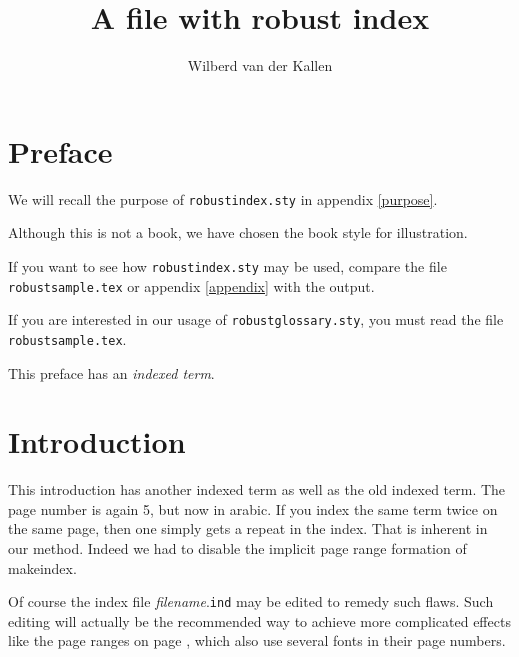 \documentclass{book}
\title {A file with robust index}
\author{Wilberd van der Kallen\index{Wilberd}}
\date{}
\begin{document}
\renewcommand\thepage{\roman{page}}

\maketitle

\tableofcontents
{}

\chapter*{Preface}
We will recall the purpose of  \verb|robustindex.sty| in appendix
\ref{purpose}.

Although this is not a book, we have chosen the book style for illustration.

If you want to see how \verb|robustindex.sty| may be used, compare the file
\verb|robustsample.tex| or appendix \ref{appendix} with the output.

If you are interested in our usage of \verb|robustglossary.sty|, you must read
the file \verb|robustsample.tex|.

This preface has an \emph{indexed term}.


\chapter{Introduction}\sloppy
\renewcommand\thepage{\arabic{page}}
\addtocounter{page}{-2}%
This introduction has another indexed term
as well as the old indexed term.
The page number is again 5, but now in arabic.
If you index the same term twice on the same page, then one simply gets
a repeat in the index.
That is inherent in our method.
Indeed we had to disable the implicit page range formation of makeindex.

Of course the index file {\it filename}.\texttt{ind}
may be edited to remedy such flaws. Such editing will actually be the
recommended way to achieve more complicated effects like the page ranges on
page \pageref{range}, which also use several fonts in their page numbers.
\end{document}
